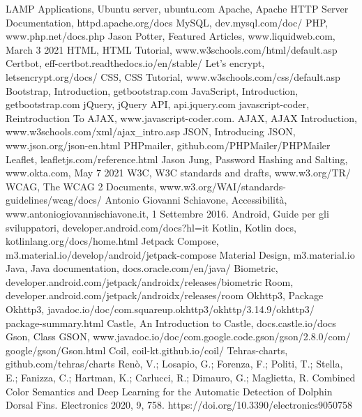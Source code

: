 \documentclass[a4paper,final,12pt]{report}
\begin{document}
\begin{thebibliography}{100}
 LAMP Applications, Ubuntu server, ubuntu.com
 Apache, Apache HTTP Server Documentation, httpd.apache.org/docs
 MySQL, dev.mysql.com/doc/
 PHP, www.php.net/docs.php
 Jason Potter, Featured Articles, www.liquidweb.com, March 3 2021
 HTML, HTML Tutorial, www.w3schools.com/html/default.asp
 Certbot, eff-certbot.readthedocs.io/en/stable/
 Let's encrypt, letsencrypt.org/docs/
 CSS, CSS Tutorial, www.w3schools.com/css/default.asp
 Bootstrap, Introduction, getbootstrap.com
 JavaScript, Introduction, getbootstrap.com
 jQuery, jQuery API, api.jquery.com
 javascript-coder, Reintroduction To AJAX, www.javascript-coder.com.
 AJAX, AJAX Introduction, www.w3schools.com/xml/ajax\_intro.asp
 JSON, Introducing JSON, www.json.org/json-en.html
 PHPmailer, github.com/PHPMailer/PHPMailer
 Leaflet, leafletjs.com/reference.html
 Jason Jung, Password Hashing and Salting, www.okta.com, May 7 2021
 W3C, W3C standards and drafts, www.w3.org/TR/
 WCAG, The WCAG 2 Documents, www.w3.org/WAI/standards-guidelines/wcag/docs/
 Antonio Giovanni Schiavone, Accessibilità, www.antoniogiovannischiavone.it, 1 Settembre 2016.
 Android, Guide per gli sviluppatori, developer.android.com/docs?hl=it
 Kotlin, Kotlin docs, kotlinlang.org/docs/home.html
 Jetpack Compose, m3.material.io/develop/android/jetpack-compose
 Material Design, m3.material.io
 Java, Java documentation, docs.oracle.com/en/java/
 Biometric, developer.android.com/jetpack/androidx/releases/biometric
 Room, developer.android.com/jetpack/androidx/releases/room
 Okhttp3, Package Okhttp3, javadoc.io/doc/com.squareup.okhttp3/okhttp/3.14.9/okhttp3/\\package-summary.html
 Castle, An Introduction to Castle, docs.castle.io/docs
 Gson, Class GSON, www.javadoc.io/doc/com.google.code.gson/gson/2.8.0/com/\\google/gson/Gson.html
 Coil, coil-kt.github.io/coil/
 Tehras-charts, github.com/tehras/charts
 Renò, V.; Losapio, G.; Forenza, F.; Politi, T.; Stella, E.; Fanizza, C.; Hartman, K.; Carlucci, R.; Dimauro, G.; Maglietta, R. Combined Color Semantics and Deep Learning for the Automatic Detection of Dolphin Dorsal Fins. Electronics 2020, 9, 758. https://doi.org/10.3390/electronics9050758

\end{thebibliography}
\end{document}
